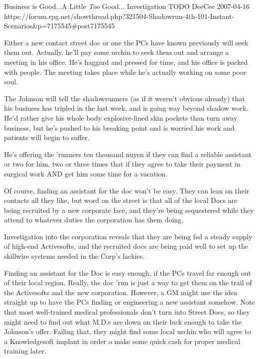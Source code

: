 \begin{scenario}{Business is Good...A Little \textit{Too} Good...}
	{Investigation}
	{TODO}
	{DeeCee}
	{2007-04-16}
	{https://forum.rpg.net/showthread.php?321504-Shadowrun-4th-101-Instant-Scenarios\&p=7175545\#post7175545}

 Either a new contact street doc or one the PCs have known previously will seek them out. Actually, he'll pay some urchin to seek them out and arrange a meeting in his office. He's haggard and pressed for time, and his office is packed with people. The meeting takes place while he's actually working on some poor soul.

\synopsis The Johnson will tell the shadowrunners (as if it weren't obvious already) that his business has tripled in the last week, and is going way beyond shadow work. He'd rather give his whole body explosive-lined skin pockets than turn away business, but he's pushed to his breaking point and is worried his work and patients will begin to suffer.

He's offering the 'runners ten thousand nuyen if they can find a reliable assistant or two for him, two or three times that if they agree to take their payment in surgical work AND get him some time for a vacation.

Of course, finding an assistant for the doc won't be easy. They can lean on their contacts all they like, but word on the street is that all of the local Docs are being recruited by a new corporate face, and they're being sequestered while they attend to whatever duties the corporation has them doing.

Investigation into the corporation reveals that they are being fed a steady supply of high-end Activesofts, and the recruited docs are being paid well to set up the skillwire systems needed in the Corp's lackies.

\notes Finding an assistant for the Doc is easy enough, if the PCs travel far enough out of their local region. Really, the doc 'run is just a way to get them on the trail of the Activesofts and the new corporation. However, a GM might use the idea straight up to have the PCs finding or engineering a new assistant somehow. Note that most well-trained medical professionals don't turn into Street Docs, so they might need to find out what M.D.s are down on their luck enough to take the Johnson's offer. Failing that, they might find some local urchin who will agree to a Knowledgesoft implant in order o make some quick cash for proper medical training later. 

\end{scenario}